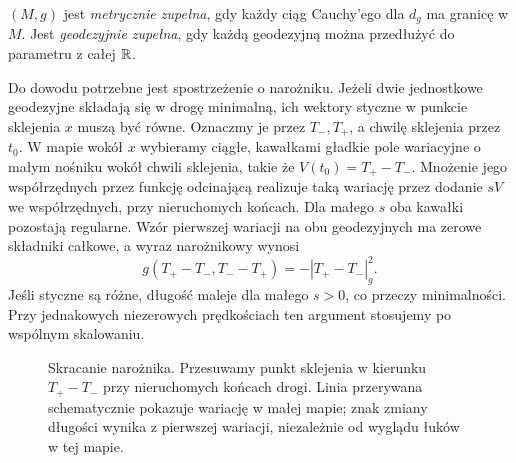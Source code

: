 \begin{definicja}
\label{def:zupelnosc-geodezyjna}
$(M,g)$ jest \emph{metrycznie zupełna}, gdy
każdy ciąg Cauchy'ego dla $d_g$ ma granicę w $M$.
Jest \emph{geodezyjnie zupełna}, gdy każdą
geodezyjną można przedłużyć do parametru
z całej $\mathbb{R}$.
\end{definicja}

Do dowodu potrzebne jest spostrzeżenie o narożniku.
Jeżeli dwie jednostkowe geodezyjne składają się w drogę
minimalną, ich wektory styczne w punkcie sklejenia $x$
muszą być równe. Oznaczmy je przez $T_-,T_+$,
a chwilę sklejenia przez $t_0$.
W mapie wokół $x$ wybieramy ciągłe, kawałkami gładkie
pole wariacyjne o małym nośniku wokół chwili sklejenia,
takie że $V(t_0)=T_+-T_-$. Mnożenie jego współrzędnych
przez funkcję odcinającą realizuje taką wariację przez
dodanie $sV$ we współrzędnych, przy nieruchomych końcach.
Dla małego $s$ oba kawałki pozostają regularne.
Wzór pierwszej wariacji na obu geodezyjnych ma zerowe
składniki całkowe, a wyraz narożnikowy wynosi
\[
 g(T_+-T_-,T_--T_+)=-|T_+-T_-|_g^2.
\]
Jeśli styczne są różne, długość maleje dla małego $s>0$,
co przeczy minimalności. Przy jednakowych niezerowych
prędkościach ten argument stosujemy po wspólnym skalowaniu.

\begin{figure}[H]
\centering
{}
\caption{Skracanie narożnika. Przesuwamy punkt sklejenia
w kierunku $T_+-T_-$ przy nieruchomych końcach drogi.
Linia przerywana schematycznie pokazuje wariację
w małej mapie; znak zmiany długości wynika z pierwszej
wariacji, niezależnie od wyglądu łuków w tej mapie.}
\label{fig:hopf-skracanie-naroznika}
\end{figure}

